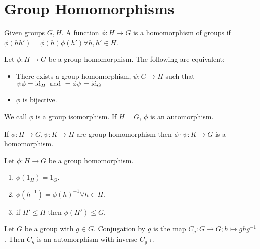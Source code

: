 \section{Group Homomorphisms}

\begin{definition}[Homomorphism]
    Given groups \(G, H\). A function \(\phi: H \to G\) is a homomorphism of groups if \(\phi(hh') = \phi(h)\phi(h') \forall h, h' \in H\).
\end{definition}


\begin{prop-defn}
Let \(\phi: H \to G\) be a group homomorphism. The following are equivalent:
\begin{itemize}
    \item There exists a group homomorphism, \(\psi: G \to H\) such that \(\psi\phi = \operatorname{id}_H \text{ and } = \phi\psi = \operatorname{id}_G\)
    \item \(\phi\) is bijective.
\end{itemize}
We call \(\phi\) is a group isomorphism. If \(H = G\), \(\phi\) is an automorphism.
\end{prop-defn}

\begin{proposition}
    If \(\phi: H \to G, \psi: K \to H\) are group homomorphism then \(\phi \cdot \psi: K \to G\) is a homomorphism.
\end{proposition}

\begin{proposition}
    Let \(\phi: H \to G\) be a group homomorphism.
    \begin{enumerate}
        \item \(\phi(1_H) = 1_G\).
        \item \(\phi(h^{-1}) = \phi(h)^{-1} \forall h \in H\).
        \item if \(H' \leq H\) then \(\phi(H') \leq G\).
    \end{enumerate}
\end{proposition}

\begin{prop-defn}
Let \(G\) be a group with \(g \in G\). Conjugation by \(g\) is the map \(C_g: G \to G; h \mapsto ghg^{-1}\). Then \(C_g\) is an automorphism with inverse \(C_{g^{-1}}\).
\end{prop-defn}

